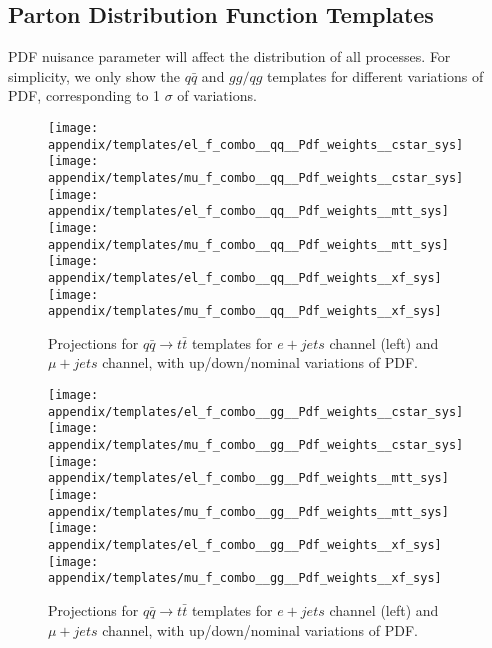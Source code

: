 \documentclass{cmspaperpdf}
\begin{document}
\subsection{Parton Distribution Function Templates}
PDF  nuisance parameter will affect the distribution of all processes. For simplicity, we only show the $q\bar q$ and $gg/qg$ templates for different variations of PDF, corresponding to 1 $\sigma$ of variations.
 	
\begin{figure}[hbt]
  \begin{center}
    \texttt{[image: appendix/templates/el\_f\_combo\_\_qq\_\_Pdf\_weights\_\_cstar\_sys]}
    \texttt{[image: appendix/templates/mu\_f\_combo\_\_qq\_\_Pdf\_weights\_\_cstar\_sys]}    
    \texttt{[image: appendix/templates/el\_f\_combo\_\_qq\_\_Pdf\_weights\_\_mtt\_sys]}
    \texttt{[image: appendix/templates/mu\_f\_combo\_\_qq\_\_Pdf\_weights\_\_mtt\_sys]}
    \texttt{[image: appendix/templates/el\_f\_combo\_\_qq\_\_Pdf\_weights\_\_xf\_sys]}
    \texttt{[image: appendix/templates/mu\_f\_combo\_\_qq\_\_Pdf\_weights\_\_xf\_sys]}
  \caption{\small Projections for $q\bar q \rightarrow t\bar t$ templates for $e+jets$ channel (left) and $\mu+jets$ channel, with up/down/nominal variations of PDF.}
  \label{appendix:PDF temp qq}
  \end{center}
\end{figure}

\begin{figure}[hbt]
  \begin{center}
    \texttt{[image: appendix/templates/el\_f\_combo\_\_gg\_\_Pdf\_weights\_\_cstar\_sys]}
    \texttt{[image: appendix/templates/mu\_f\_combo\_\_gg\_\_Pdf\_weights\_\_cstar\_sys]}    
    \texttt{[image: appendix/templates/el\_f\_combo\_\_gg\_\_Pdf\_weights\_\_mtt\_sys]}
    \texttt{[image: appendix/templates/mu\_f\_combo\_\_gg\_\_Pdf\_weights\_\_mtt\_sys]}
    \texttt{[image: appendix/templates/el\_f\_combo\_\_gg\_\_Pdf\_weights\_\_xf\_sys]}
    \texttt{[image: appendix/templates/mu\_f\_combo\_\_gg\_\_Pdf\_weights\_\_xf\_sys]}
  \caption{\small Projections for $q\bar q \rightarrow t\bar t$ templates for $e+jets$ channel (left) and $\mu+jets$ channel, with up/down/nominal variations of PDF.}
  \label{appendix:PDF temp gg}
  \end{center}
\end{figure}
\end{document}
